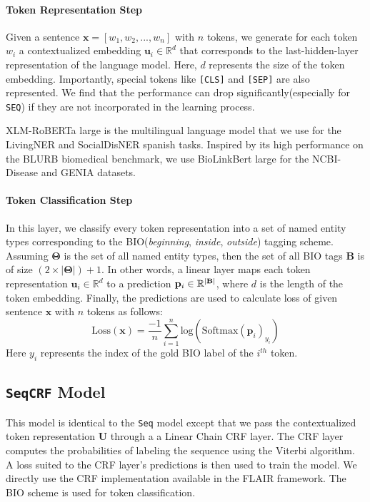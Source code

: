 \documentclass[11pt]{article}
\renewcommand{\vec}[1]{\mathbf{#1}}
\begin{document}
\paragraph{Token Representation Step} 
Given a sentence $\vec{x} = [w_{1},
w_{2}, ..., w_{n}]$ with $n$ tokens, we generate for each token $w_{i}$  
a contextualized embedding $\vec{u}_{i} \in \mathbb{R}^{d}$ 
that corresponds to the last-hidden-layer 
representation of the language model. 
Here, $d$ represents the size of the token embedding.
Importantly, special tokens like \texttt{[CLS]} and \texttt{[SEP]} are also represented. 
We find that the performance can drop significantly(especially for \texttt{SEQ}) if they are not incorporated in the learning process.

XLM-RoBERTa large\cite{xlm} is the multilingual language model that we use for the LivingNER and SocialDisNER spanish tasks.
Inspired by its high performance on the BLURB\cite{gu2021domain} biomedical benchmark, 
we use BioLinkBert large\cite{yasunaga-etal-2022-linkbert} for the NCBI-Disease and GENIA datasets.

\paragraph{Token Classification Step} In this layer, we classify every token
representation into a set of named entity types corresponding to the
BIO(\textit{beginning}, \textit{inside}, \textit{outside}) tagging scheme.
Assuming $\mathbf{\Theta}$ is the set of all named entity types,
then the set of all BIO tags $\mathbf{B}$ is of size $(2 \times |\vec{\Theta}|) + 1$. In other
words, a linear layer maps each token representation $\vec{u}_{i} \in
\mathbb{R}^{d}$ to a prediction $\vec{p}_{i} \in \mathbb{R}^{|\bf{B}|}$, where
$d$ is the length of the token embedding. Finally, the predictions are used to
calculate loss of given sentence $\vec{x}$ with $n$ tokens as follows:
\begin{equation} \text{Loss}(\vec{x}) =
\frac{-1}{n}\sum_{i=1}^{n}\text{log}(\text{Softmax}(\vec{p}_{i})_{y_{i}})
\end{equation} Here $y_{i}$ represents the index of the gold BIO label of the
$i^{th}$ token.

\subsection{\texttt{SeqCRF} Model}
This model is identical to the \texttt{Seq} model except that
we pass the contextualized token representation $\vec{U}$ through a a Linear Chain CRF\cite{lafferty2001conditional} layer.
The CRF layer computes the probabilities of labeling the sequence using the Viterbi algorithm\cite{forney1973viterbi}.
A loss suited to the CRF layer's predictions is then used to train the model. 
We directly use the CRF implementation available in the FLAIR\cite{akbik-etal-2019-flair} framework. The BIO scheme is used for token classification.
\end{document}
